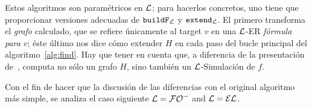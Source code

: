 Estos algoritmos son param\'etricos en $\mathcal{L}$; para hacerlos concretos, uno
tiene que proporcionar versiones adecuadas de $\texttt{buildF}_{\mathcal{L}}$ y
$\texttt{extend}_{\mathcal{L}}$. El primero transforma el {\em grafo} calculado, que se refiere \'unicamente al target $v$ en una $\mathcal{L}$-ER {\em
f\'ormula para} $v$; \'este \'ultimo nos dice c\'omo extender $H$ en cada paso
del bucle principal del algoritmo~\ref{alg:find}. Hay que tener en cuenta que, a diferencia de la
presentaci\'on de~\cite{graph},  computa
no s\'olo un grafo $H$, sino tambi\'en un $\mathcal{L}$-Simulaci\'on de $f$.

%
%
%
%
%
%
%
%
%

Con el fin de hacer que la discusi\'on de las diferencias con el original
algoritmo m\'as simple, se analiza el caso siguiente $\mathcal{L}={\mathcal{FO}^-}$ and $\mathcal{L}=\mathcal{EL}$.

%
%
